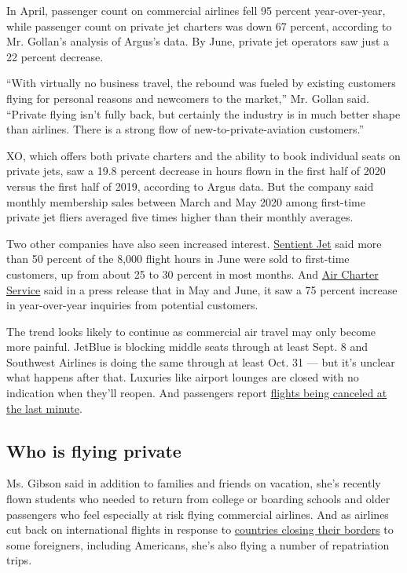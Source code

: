 In April, passenger count on commercial airlines fell 95 percent
year-over-year, while passenger count on private jet charters was down
67 percent, according to Mr. Gollan's analysis of Argus's data. By June,
private jet operators saw just a 22 percent decrease.

``With virtually no business travel, the rebound was fueled by existing
customers flying for personal reasons and newcomers to the market,'' Mr.
Gollan said. ``Private flying isn't fully back, but certainly the
industry is in much better shape than airlines. There is a strong flow
of new-to-private-aviation customers.''

XO, which offers both private charters and the ability to book
individual seats on private jets, saw a 19.8 percent decrease in hours
flown in the first half of 2020 versus the first half of 2019, according
to Argus data. But the company said monthly membership sales between
March and May 2020 among first-time private jet fliers averaged five
times higher than their monthly averages.

Two other companies have also seen increased interest.
\href{https://www.sentient.com/}{Sentient Jet} said more than 50 percent
of the 8,000 flight hours in June were sold to first-time customers, up
from about 25 to 30 percent in most months. And
\href{https://www.aircharterserviceusa.com/}{Air Charter Service} said
in a press release that in May and June, it saw a 75 percent increase in
year-over-year inquiries from potential customers.

The trend looks likely to continue as commercial air travel may only
become more painful. JetBlue is blocking middle seats through at least
Sept. 8 and Southwest Airlines is doing the same through at least Oct.
31 --- but it's unclear what happens after that. Luxuries like airport
lounges are closed with no indication when they'll reopen. And
passengers report
\href{https://www.nytimes3xbfgragh.onion/2020/06/18/travel/travel-refunds-airlines.html}{flights
being canceled at the last minute}.

\hypertarget{who-is-flying-private}{%
\subsection{Who is flying private}\label{who-is-flying-private}}

Ms. Gibson said in addition to families and friends on vacation, she's
recently flown students who needed to return from college or boarding
schools and older passengers who feel especially at risk flying
commercial airlines. And as airlines cut back on international flights
in response to
\href{https://www.nytimes3xbfgragh.onion/article/coronavirus-travel-restrictions.html}{countries
closing their borders} to some foreigners, including Americans, she's
also flying a number of repatriation trips.

